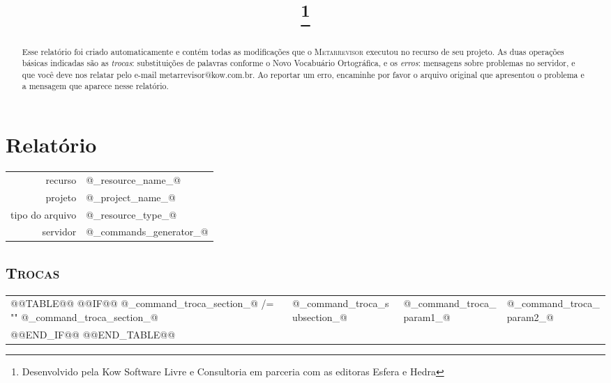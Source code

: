 \documentclass{article}
\title{\Huge \textls{\textsc{metarrevisor}}\footnote{Desenvolvido pela Kow Software Livre e Consultoria em parceria com as editoras Esfera e Hedra}}
\begin{document}
\maketitle


\begin{abstract}
Esse relatório foi criado automaticamente e contém todas as modificações 
que o \textsc{Metarrevisor} executou no recurso de seu projeto. 
As duas operações básicas indicadas são as \textit{trocas}: substituições
de palavras  conforme o Novo Vocabuário Ortográfica, e os \textit{erros}:
mensagens sobre problemas no servidor, e que você deve nos relatar
pelo e-mail metarrevisor@kow.com.br. Ao reportar um erro,  encaminhe por favor o 
arquivo original que apresentou o problema e a mensagem que aparece nesse relatório.
\end{abstract}


\setcounter{tocdepth}{2}            %
\setcounter{secnumdepth}{1}   %
\tableofcontents

\section{Relatório}

	\begin{center}
		\begin{xtabular}{rp{.6\textwidth}}
			recurso			& @_resource_name_@ \\
			projeto			& @_project_name_@ \\
			tipo do arquivo		& @_resource_type_@ \\
			servidor		& @_commands_generator_@ 
		\end{xtabular}
	\end{center}


	\subsection{\textsc{Trocas}}
	
	
		\begin{center}
			\begin{xtabular}{l | l | p{.3\textwidth} | p{.3\textwidth}}
				@@TABLE@@
					@@IF@@ @_command_troca_section_@ /= ""
						@_command_troca_section_@	& 
						@_command_troca_subsection_@	& 
						@_command_troca_param1_@	& 
						@_command_troca_param2_@ \\
					@@END_IF@@
				@@END_TABLE@@
			\end{xtabular}
		\end{center}
\end{document}

